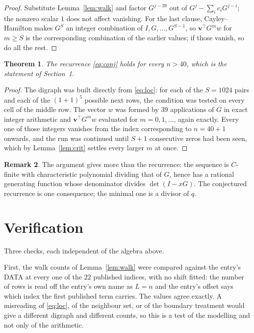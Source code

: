 \documentclass[11pt,a4paper]{article}
\theoremstyle{plain}
\newtheorem{theorem}{Theorem}
\theoremstyle{definition}
\newtheorem{remark}[theorem]{Remark}
\begin{document}
\begin{proof}
Substitute Lemma~\ref{lem:walk} and factor $G^{j-39}$ out of
$G^{j}-\sum_ic_iG^{j-i}$; the nonzero scalar $1$ does not affect
vanishing. For the last clause, Cayley--Hamilton makes $G^{S}$ an integer combination of
$I,G,\dots,G^{S-1}$, so $\mathbf{v}^{\!\top}G^{m}w$ for $m\ge S$ is the corresponding
combination of the earlier values; if those vanish, so do all the rest.
\end{proof}

\begin{theorem}
The recurrence \eqref{eq:conj} holds for every $n>40$, which is the statement of
Section~1.
\end{theorem}

\begin{proof}
The digraph was built directly from \eqref{eq:loc}: for each of the $S=1024$ pairs and each
of the $(1+1)^{5}$ possible next rows, the condition was tested on every cell of
the middle row. The vector $w$ was formed by $39$ applications of $G$ in exact integer
arithmetic and $\mathbf{v}^{\!\top}G^{m}w$ evaluated for $m=0,1,\dots$, again exactly.
Every one of those integers vanishes from the index corresponding to $n=40+1$ onwards,
and the run was continued until $S+1$ consecutive zeros had been seen, which by
Lemma~\ref{lem:crit} settles every larger $m$ at once.
\end{proof}

\begin{remark}
The argument gives more than the recurrence: the sequence is $C$-finite with characteristic
polynomial dividing that of $G$, hence has a rational generating function whose denominator
divides $\det(I-xG)$. The conjectured recurrence is one consequence; the minimal one is a
divisor of $q$.
\end{remark}

\section{Verification}

Three checks, each independent of the algebra above.

First, the walk counts of Lemma~\ref{lem:walk} were compared against the entry's DATA at
every one of the $22$ published indices, with no shift fitted: the number of rows is
read off the entry's own name as $L=n$ and the entry's offset says which index the first
published term carries. The values agree exactly. A misreading of \eqref{eq:loc}, of the
neighbour set, or of the boundary treatment would give a different digraph and different
counts, so this is a test of the modelling and not only of the arithmetic.
\end{document}
